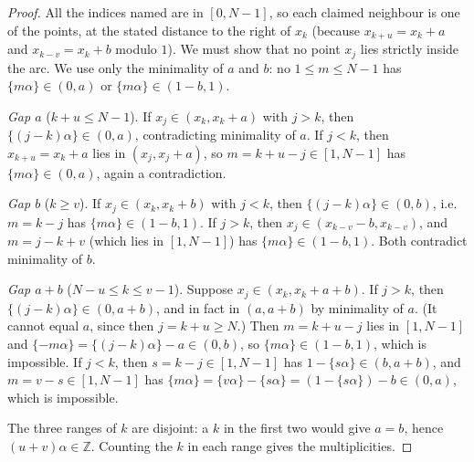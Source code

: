 \documentclass[11pt,openany]{book}
\theoremstyle{plain}
\theoremstyle{definition}
\theoremstyle{remark}
\newcommand{\Z}{\mathbb{Z}}
\begin{document}
\begin{proof}
All the indices named are in $[0,N-1]$, so each claimed neighbour is one of the points, at the stated
distance to the right of $x_k$ (because $x_{k+u}=x_k+a$ and $x_{k-v}=x_k+b$ modulo $1$). We must
show that no point $x_j$ lies strictly inside the arc. We use only the minimality of $a$ and $b$: no
$1\le m\le N-1$ has $\{m\alpha\}\in(0,a)$ or $\{m\alpha\}\in(1-b,1)$.

\emph{Gap $a$} ($k+u\le N-1$). If $x_j\in(x_k,x_k+a)$ with $j>k$, then $\{(j-k)\alpha\}\in(0,a)$,
contradicting minimality of $a$. If $j<k$, then $x_{k+u}=x_k+a$ lies in $(x_j,x_j+a)$, so
$m=k+u-j\in[1,N-1]$ has $\{m\alpha\}\in(0,a)$, again a contradiction.

\emph{Gap $b$} ($k\ge v$). If $x_j\in(x_k,x_k+b)$ with $j<k$, then $\{(j-k)\alpha\}\in(0,b)$, i.e.\
$m=k-j$ has $\{m\alpha\}\in(1-b,1)$. If $j>k$, then $x_j\in(x_{k-v}-b,x_{k-v})$, and $m=j-k+v$
(which lies in $[1,N-1]$) has $\{m\alpha\}\in(1-b,1)$. Both contradict minimality of $b$.

\emph{Gap $a+b$} ($N-u\le k\le v-1$). Suppose $x_j\in(x_k,x_k+a+b)$. If $j>k$, then
$\{(j-k)\alpha\}\in(0,a+b)$, and in fact in $(a,a+b)$ by minimality of $a$. (It cannot equal $a$,
since then $j=k+u\ge N$.) Then $m=k+u-j$ lies in $[1,N-1]$ and $\{-m\alpha\}=\{(j-k)\alpha\}-a\in(0,b)$, so
$\{m\alpha\}\in(1-b,1)$, which is impossible. If $j<k$, then $s=k-j\in[1,N-1]$ has
$1-\{s\alpha\}\in(b,a+b)$, and $m=v-s\in[1,N-1]$ has
$\{m\alpha\}=\{v\alpha\}-\{s\alpha\}=(1-\{s\alpha\})-b\in(0,a)$, which is impossible.

The three ranges of $k$ are disjoint: a $k$ in the first two would give $a=b$, hence
$(u+v)\alpha\in\Z$. Counting the $k$ in each range gives the multiplicities.
\end{proof}
\end{document}
